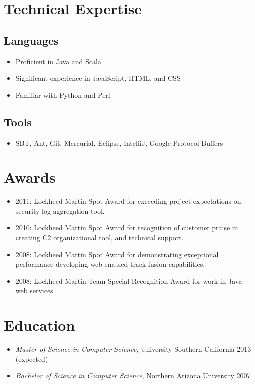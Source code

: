 \documentclass[11pt]{article}
\begin{document}
\section*{Technical Expertise}
\label{sec-2}

\subsection*{Languages}
\label{sec-2.1}

\begin{itemize}
\item Proficient in Java and Scala
\item Significant experience in JavaScript, HTML, and CSS
\item Familiar with Python and Perl
\end{itemize}
\subsection*{Tools}
\label{sec-2.2}

\begin{itemize}
\item SBT, Ant, Git, Mercurial, Eclipse, IntelliJ, Google Protocol Buffers
\end{itemize}
\section*{Awards}
\label{sec-3}

\begin{itemize}
\item 2011: Lockheed Martin Spot Award for exceeding project expectations on security log aggregation tool.
\item 2010: Lockheed Martin Spot Award for recognition of customer praise in creating C2 organizational tool, and technical support.
\item 2008: Lockheed Martin Spot Award for demonstrating exceptional performance developing web enabled track fusion capabilities.
\item 2008: Lockheed Martin Team Special Recognition Award for work in Java web services.
\end{itemize}
\section*{Education}
\label{sec-4}

\begin{itemize}
\item \emph{Master of Science in Computer Science}, University Southern California 2013 (expected)
\item \emph{Bachelor of Science in Computer Science}, Northern Arizona University 2007
\end{itemize}
\end{document}
